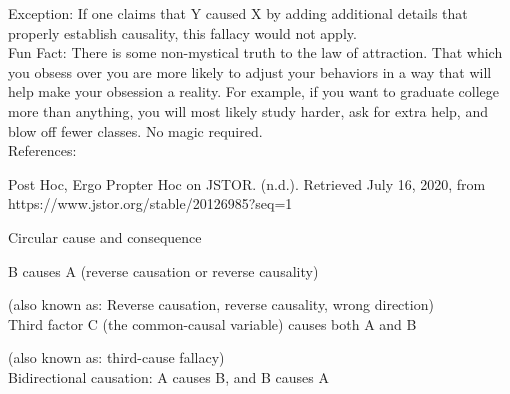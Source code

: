 \documentclass[a4paper,12pt,single,pdftex]{scrartcl}
\begin{document}
      
        Exception: If one claims that Y caused X by adding additional details that properly establish causality, this fallacy would not apply.
      \\

      
        Fun Fact: There is some non-mystical truth to the law of attraction. That which you obsess over you are more likely to adjust your behaviors in a way that will help make your obsession a reality. For example, if you want to graduate college more than anything, you will most likely study harder, ask for extra help, and blow off fewer classes. No magic required.
      \\

    
    References:

    
      Post Hoc, Ergo Propter Hoc on JSTOR. (n.d.). Retrieved July 16, 2020, from https://www.jstor.org/stable/20126985?seq=1
    
  

Circular cause and consequence

B causes A (reverse causation or reverse causality)
    
      (also known as: Reverse causation, reverse causality, wrong direction)
    \\

  

Third factor C (the common-causal variable) causes both A and B
    
      (also known as: third-cause fallacy)
    \\

  

Bidirectional causation: A causes B, and B causes A
\end{document}
